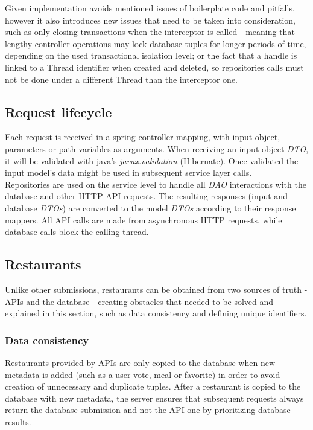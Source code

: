 Given implementation avoids mentioned issues of boilerplate code and pitfalls, however it also introduces new issues that need to be taken into consideration,
such as only closing transactions when the interceptor is called - meaning that lengthy controller operations may lock database tuples for longer periods of time,
depending on the used transactional isolation level;  or the fact that a handle is linked to a Thread identifier when created and deleted, so repositories calls must
not be done under a different Thread than the interceptor one.

\subsection{Request lifecycle}
Each request is received in a spring controller mapping, with input object,
parameters or path variables as arguments. When receiving an input object \textit{DTO},
it will be validated with java's \textit{javax.validation} (Hibernate).
Once validated the input model's data might be used in subsequent service layer calls.\\

Repositories are used on the service level to handle all \textit{DAO} interactions with
the database and other HTTP API requests. The resulting responses (input and database \textit{DTOs})
are converted to the model \textit{DTOs} according to their response mappers.
All API calls are made from asynchronous HTTP requests, while database calls block the calling thread.\\

\subsection{Restaurants}

Unlike other submissions, restaurants can be obtained from two sources of truth - APIs and the database -
creating obstacles that needed to be solved and explained in this section, such as data consistency and defining unique identifiers.\\

\subsubsection{Data consistency}

Restaurants provided by APIs are only copied to the database when new metadata is added (such as a user vote, meal or favorite) in order
to avoid creation of unnecessary and duplicate tuples. After a restaurant is copied to the database with new metadata, the server ensures
that subsequent requests always return the database submission and not the API one by prioritizing database results.\\

